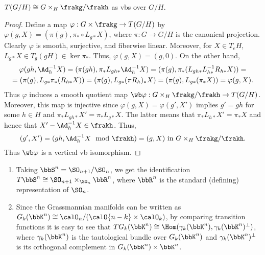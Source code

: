 \begin{prop}\label{prop 4.5.1 Sharpe}
    $T(G\slash H)\cong G\times_H \frakg\slash\frakh$ as \glspl{vb} over $G\slash H$.
\end{prop}
\begin{proof}
    Define a map $\varphi:G\times \frakg\to T(G\slash H)$ by $\varphi(g, X)=(\pi(g),\pi_\ast \circ L_{g\ast}X)$, where $\pi:G\to G\slash H$ is the canonical projection. Clearly $\varphi$ is smooth, surjective, and fiberwise linear. Moreover, for $X\in T_eH$, $L_{g\ast}X\in T_g(gH)\in\ker\pi_\ast$. Thus, $\varphi(g, X)=(g,0)$. On the other hand,
    \begin{multline}
        \varphi(gh,\Ad_h^{-1}X)=(\pi(gh),\pi_\ast L_{gh\ast}\Ad_h^{-1}X)=(\pi(g),\pi_\ast(L_{gh\ast}L_{h\ast}^{-1} R_{h\ast}X))=\\
        =(\pi(g),L_{g\ast }\pi_\ast (R_{h\ast}X))=(\pi(g),L_{g\ast}(\pi R_h)_\ast X)
        =(\pi(g),L_{g\ast}(\pi_\ast X))=\varphi(g,X).
    \end{multline}
    Thus $\varphi$ induces a smooth quotient map $\wb\varphi:G\times_H \frakg\slash\frakh\to T(G\slash H)$. Moreover, this map is injective since $\varphi(g,X)=\varphi(g',X')$ implies $g'=gh$ for some $h\in H$ and $\pi_\ast L_{gh\ast}X'=\pi_\ast L_{g\ast}X$. The latter means that $\pi_\ast L_{h\ast}X'=\pi_\ast X$ and hence that $X'-\Ad_h^{-1}X\in\frakh$. Thus,
    \[(g',X')=(gh,\Ad_h^{-1}X\mod\frakh)=(g,X)\text{ in } G\times_H\frakg\slash\frakh.\]
    Thus $\wb\varphi$ is a vertical \gls{vb} isomorphism.
\end{proof}


\begin{example}
    \begin{enumerate}
        \item Taking $\bbS^n=\SO_{n+1}\slash \SO_n$, we get the identification $T\bbS^n\cong \SO_{n+1}\times_{\SO_n}\bbR^n$, where $\bbR^n$ is the standard (defining) representation of $\SO_n$.
        \item Since the Grassmannian manifolds can be written as $G_k(\bbK^n)\cong \calO_n\slash (\calO{n-k}\times \calO_{k})$, by comparing transition functions it is easy to see that $TG_k(\bbK^n)\cong \Hom(\gamma_k(\bbK^n),\gamma_k(\bbK^n)^\perp)$, where $\gamma_k(\bbK^n)$ is the tautological bundle over $G_k(\bbK^n)$ and $\gamma_k(\bbK^n)^\perp$ is its orthogonal complement in $G_k(\bbK^n)\times \bbK^n$.
    \end{enumerate}
\end{example}


